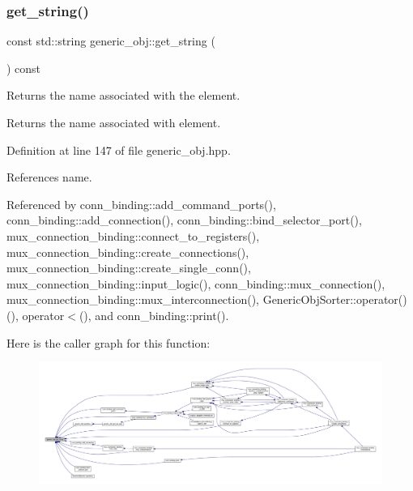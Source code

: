 \subsubsection{\texorpdfstring{get\+\_\+string()}{get\_string()}}
{\footnotesize\ttfamily const std\+::string generic\+\_\+obj\+::get\+\_\+string (\begin{DoxyParamCaption}{ }\end{DoxyParamCaption}) const\hspace{0.3cm}{\ttfamily [inline]}}



Returns the name associated with the element. 

\begin{DoxyReturn}{Returns}
the name associated with element. 
\end{DoxyReturn}


Definition at line 147 of file generic\+\_\+obj.\+hpp.



References name.



Referenced by conn\+\_\+binding\+::add\+\_\+command\+\_\+ports(), conn\+\_\+binding\+::add\+\_\+connection(), conn\+\_\+binding\+::bind\+\_\+selector\+\_\+port(), mux\+\_\+connection\+\_\+binding\+::connect\+\_\+to\+\_\+registers(), mux\+\_\+connection\+\_\+binding\+::create\+\_\+connections(), mux\+\_\+connection\+\_\+binding\+::create\+\_\+single\+\_\+conn(), mux\+\_\+connection\+\_\+binding\+::input\+\_\+logic(), conn\+\_\+binding\+::mux\+\_\+connection(), mux\+\_\+connection\+\_\+binding\+::mux\+\_\+interconnection(), Generic\+Obj\+Sorter\+::operator()(), operator$<$(), and conn\+\_\+binding\+::print().

Here is the caller graph for this function\+:
\nopagebreak
\begin{figure}[H]
\begin{center}
\leavevmode
\includegraphics[width=350pt]{d1/d64/classgeneric__obj_a9e77dcf1f30df84e3bbfbfa1e274a649_icgraph}
\end{center}
\end{figure}
\mbox{\label{classgeneric__obj_a1de67b6b028dd7548f5ce367779cec25}} 
